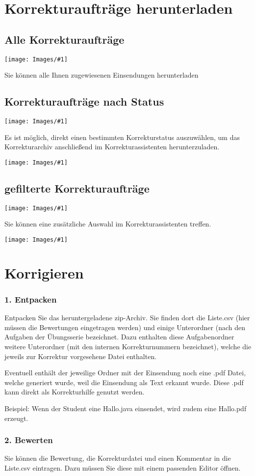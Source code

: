 \documentclass[a4paper,final, parskip]{scrartcl}
\title
{}
\author 
{}
\date{\vspace{12cm}\monthword{\the\month}\space\the\year}
\subtitle
{}
\numberwithin{equation}{section}
\newenvironment{Bilder}
  {\par\raggedbottom\null\noindent\minipage{\textwidth}\centering}
  {\endminipage\vspace{0.7cm}}
\newcommand{\tbild}[1]{
\begin{Bilder}
 \texttt{[image: Images/\#1]}
	\end{Bilder}
}
\begin{document}
\pagestyle{seite}
\section{Korrekturaufträge herunterladen}
\subsection{Alle Korrekturaufträge}
\tbild{pathA.png}
Sie können alle Ihnen zugewiesenen Einsendungen herunterladen

\subsection{Korrekturaufträge nach Status}
\tbild{pathB.png}
Es ist möglich, direkt einen bestimmten Korrekturstatus auszuwählen, um das Korrekturarchiv anschließend im Korrekturassistenten herunterzuladen.
\tbild{pathC.png}

\subsection{gefilterte Korrekturaufträge}
\tbild{pathD.png}
Sie können eine zusätzliche Auswahl im Korrekturassistenten treffen.
\tbild{pathE.png}

\newpage
\section{Korrigieren}
\subsubsection*{1. Entpacken}
Entpacken Sie das heruntergeladene zip-Archiv.
Sie finden dort die Liste.csv (hier müssen die Bewertungen eingetragen werden) und einige Unterordner (nach den Aufgaben der Übungsserie bezeichnet. Dazu enthalten diese Aufgabenordner weitere Unterordner (mit den internen Korrekturnummern bezeichnet), welche die jeweils zur Korrektur vorgesehene Datei enthalten.

Eventuell enthält der jeweilige Ordner mit der Einsendung noch eine .pdf Datei, welche generiert wurde, weil die Einsendung als Text erkannt wurde. Diese .pdf kann direkt als Korrekturhilfe genutzt werden.

Beispiel: Wenn der Student eine Hallo.java einsendet, wird zudem eine Hallo.pdf erzeugt. 

\subsubsection*{2. Bewerten}
Sie können die Bewertung, die Korrekturdatei und einen Kommentar in die Liste.csv eintragen. Dazu müssen Sie diese mit einem passenden Editor öffnen. 
\end{document}
